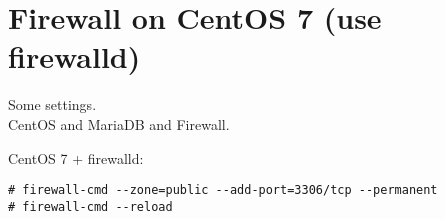 \section{Firewall on CentOS 7 (use firewalld)}
\par
Some settings. \\
CentOS and MariaDB and Firewall.

\par
CentOS 7 + firewalld:
\begin{Verbatim}[frame=single]
# firewall-cmd --zone=public --add-port=3306/tcp --permanent
# firewall-cmd --reload
\end{Verbatim}